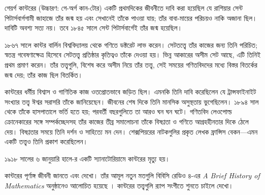 \documentclass[../../../include/open-logic-section]{subfiles}
\begin{document}



গেয়র্গ কান্টরের (উচ্চারণ: গে-অর্গ কান-টোর) একটি
প্রথমদিকের জীবনীতে দাবি করা হয়েছিল যে রাশিয়ার সেন্ট
পিটার্সবার্গগামী জাহাজে তাঁর জন্ম হয় এবং সেখানেই তাঁকে
পাওয়া যায়; তাঁর বাবা-মায়ের পরিচয়ও নাকি অজানা ছিল।
দাবিটি অবশ্য সত্য নয়। তবে ১৮৪৫ সালে সেন্ট পিটার্সবার্গেই
তাঁর জন্ম হয়েছিল।

১৮৬৭ সালে কান্টর বার্লিন বিশ্ববিদ্যালয় থেকে গণিতে
ডক্টরেট লাভ করেন। সেটতত্ত্বে তাঁর কাজের জন্য তিনি পরিচিত;
স্বতন্ত্র গবেষণাক্ষেত্র হিসেবে সেটতত্ত্ব প্রতিষ্ঠার কৃতিত্বও
তাঁকে দেওয়া হয়। ভিন্ন আকারের অসীম সেট আছে, এটি
তিনিই প্রথম প্রমাণ করেন। তাঁর তত্ত্বগুলি, বিশেষ করে
অসীম নিয়ে তাঁর তত্ত্ব, সেই সময়ের গণিতবিদদের মধ্যে
বিস্তর বিতর্কের জন্ম দেয়; তাঁর কাজ ছিল বিতর্কিত।

কান্টরের ধর্মীয় বিশ্বাস ও গাণিতিক কাজ ওতপ্রোতভাবে
জড়িত ছিল। এমনকি তিনি দাবি করেছিলেন যে ট্রান্সফাইনাইট
সংখ্যার তত্ত্ব ঈশ্বর সরাসরি তাঁকে জানিয়েছেন। জীবনের শেষ
দিকে তিনি মানসিক অসুস্থতায় ভুগেছিলেন। ১৮৯৪ সাল থেকে
তাঁকে হাসপাতালে ভর্তি হতে হয়; পরবর্তী বছরগুলিতে তা
আরও ঘন ঘন ঘটে। গণিতবিদ লেওপোল্ড ক্রোনেকারের সঙ্গে
সম্পর্কচ্ছেদসহ তাঁর কাজের তীব্র সমালোচনা তাঁকে বিষণ্ণতা
ও গণিতে আগ্রহহীনতার দিকে ঠেলে দেয়। বিষণ্ণতার সময়ে
তিনি দর্শন ও সাহিত্যে মন দেন। শেক্সপিয়রের নাটকগুলির
প্রকৃত লেখক ফ্রান্সিস বেকন—এমন একটি তত্ত্বও তিনি
প্রকাশ করেছিলেন।

১৯১৮ সালের ৬ জানুয়ারি হালে-র একটি স্যানাটোরিয়ামে
কান্টরের মৃত্যু হয়।

\begin{reading}
কান্টরের পূর্ণাঙ্গ জীবনী জানতে \citet{Dauben1990} এবং
\citet{Grattan-Guinness1971} দেখো। তাঁর আমূল নতুন
মতগুলি বিবিসি রেডিও ৪-এর \emph{A Brief History of
  Mathematics} অনুষ্ঠানেও আলোচিত হয়েছে
\citep{Sautoy2014}। কান্টরের তত্ত্বগুলি র‍্যাপ সংগীতে
শুনতে চাইলে \citet{Rose2012} দেখো।
\end{reading}
\end{document}
